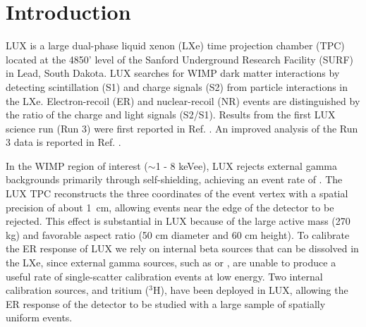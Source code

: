 \section{Introduction}

LUX is a large dual-phase liquid xenon (LXe) time projection chamber (TPC) located at the 4850' level of the Sanford Underground Research Facility (SURF) in Lead, South Dakota. LUX searches for WIMP dark matter interactions by detecting scintillation (S1) and charge signals (S2) from particle interactions in the LXe. Electron-recoil (ER) and nuclear-recoil (NR) events are distinguished by the ratio of the charge and light signals (S2/S1). Results from the first LUX science run (Run 3) were first reported in Ref. \cite{Akerib:2013tjd}. An improved analysis of the Run 3 data is reported in Ref. \cite{lux-reanalysis}.

In the WIMP region of interest ($\sim$1 - 8 keVee), LUX rejects external gamma backgrounds primarily through self-shielding, achieving an event rate of .  The LUX TPC reconstructs the three coordinates of the event vertex with a spatial precision of about 1~cm,  allowing events near the edge of the detector to be rejected. This effect is substantial in LUX because of the large active mass (270 kg) and favorable aspect ratio (50 cm diameter and 60 cm height). To calibrate the ER response of LUX we rely on internal beta sources that can be dissolved in the LXe, since external gamma sources, such as \cssrc or \thsrc, are unable to produce a useful rate of single-scatter calibration events at low energy. Two internal calibration sources,  \krsrc\cite{Kastens:2009rt, baudis} and tritium ($^{3}$H), have been deployed in LUX, allowing the ER response of the detector to be studied with a large sample of spatially uniform events.


